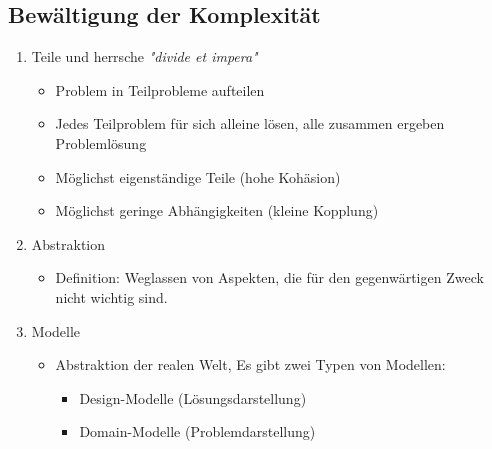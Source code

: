 \subsection{Bewältigung der Komplexität}	
		\begin{enumerate}
			\item Teile und herrsche \textit{"divide et impera"}
					\begin{itemize}
						\item Problem in Teilprobleme aufteilen
						\item Jedes Teilproblem für sich alleine lösen, alle zusammen ergeben Problemlösung
						\item Möglichst eigenständige Teile (hohe Kohäsion)
						\item Möglichst geringe Abhängigkeiten (kleine Kopplung)
					\end{itemize}
			\item Abstraktion
					\begin{itemize}
						\item Definition: Weglassen von Aspekten, die für den gegenwärtigen Zweck nicht wichtig sind.
					\end{itemize}
			\item Modelle
					\begin{itemize}
						\item Abstraktion der realen Welt, Es gibt zwei Typen von Modellen:
                        \begin{itemize}
                        \item Design-Modelle (Lösungsdarstellung)
                        \item Domain-Modelle (Problemdarstellung)
                        \end{itemize}
					\end{itemize}
		\end{enumerate}


